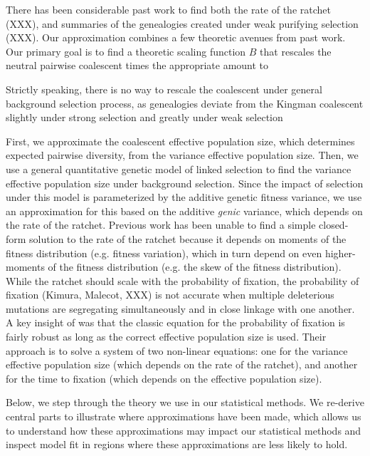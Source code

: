 \documentclass[11pt]{article}
\begin{document}

There has been considerable past work to find both the rate of the ratchet
(XXX), and summaries of the genealogies created under weak purifying selection
(XXX). Our approximation combines a few theoretic avenues from past work. Our
primary goal is to find a theoretic scaling function $B$ that rescales the neutral
pairwise coalescent times the appropriate amount to 

Strictly speaking, there is no way to rescale the coalescent under general
background selection process, as genealogies deviate from the Kingman
coalescent slightly under strong selection
\parencite{Walczak2012-fi,Cvijovic2018-vd} and greatly under weak selection
\parencite{OFallon2010-my}

First, we approximate the coalescent effective population size, which
determines expected pairwise diversity, from the variance effective population
size. Then, we use a general quantitative genetic model of linked selection to
find the variance effective population size under background selection. Since
the impact of selection under this model is parameterized by the additive
genetic fitness variance, we use an approximation for this based on the
additive \emph{genic} variance, which depends on the rate of the ratchet.
Previous work has been unable to find a simple closed-form solution to the rate
of the ratchet because it depends on moments of the fitness distribution (e.g.
fitness variation), which in turn depend on even higher-moments of the fitness
distribution (e.g. the skew of the fitness distribution). While the ratchet
should scale with the probability of fixation, the probability of fixation
(Kimura, Malecot, XXX) is not accurate when multiple deleterious mutations are
segregating simultaneously and in close linkage with one another. A key insight
of \textcite{Santiago2016-mu} was that the classic equation for the probability
of fixation is fairly robust as long as the correct effective population size
is used. Their approach is to solve a system of two non-linear equations: one
for the variance effective population size (which depends on the rate of the
ratchet), and another for the time to fixation (which depends on the effective
population size).

Below, we step through the theory we use in our statistical methods. We
re-derive central parts to illustrate where approximations have been made,
which allows us to understand how these approximations may impact our
statistical methods and inspect model fit in regions where these approximations
are less likely to hold.
\end{document}
